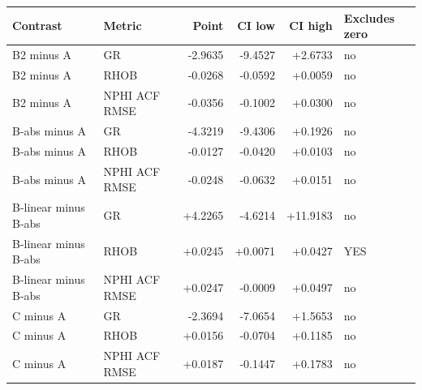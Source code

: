 \begin{tabular}{llrrrl}
\toprule
Contrast & Metric & Point & CI low & CI high & Excludes zero \\
\midrule
B2 minus A & GR & -2.9635 & -9.4527 & +2.6733 & no \\
B2 minus A & RHOB & -0.0268 & -0.0592 & +0.0059 & no \\
B2 minus A & NPHI ACF RMSE & -0.0356 & -0.1002 & +0.0300 & no \\
B-abs minus A & GR & -4.3219 & -9.4306 & +0.1926 & no \\
B-abs minus A & RHOB & -0.0127 & -0.0420 & +0.0103 & no \\
B-abs minus A & NPHI ACF RMSE & -0.0248 & -0.0632 & +0.0151 & no \\
B-linear minus B-abs & GR & +4.2265 & -4.6214 & +11.9183 & no \\
B-linear minus B-abs & RHOB & +0.0245 & +0.0071 & +0.0427 & YES \\
B-linear minus B-abs & NPHI ACF RMSE & +0.0247 & -0.0009 & +0.0497 & no \\
C minus A & GR & -2.3694 & -7.0654 & +1.5653 & no \\
C minus A & RHOB & +0.0156 & -0.0704 & +0.1185 & no \\
C minus A & NPHI ACF RMSE & +0.0187 & -0.1447 & +0.1783 & no \\
\bottomrule
\end{tabular}
